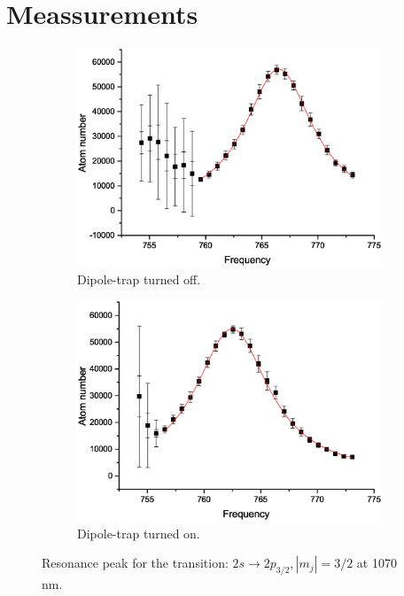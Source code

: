 \chapter{Meassurements}

\begin{figure}[H]
\centering
\begin{subfigure}[b]{0.48\textwidth}
                \includegraphics[width=\textwidth]{withoutodt}
                \caption{Dipole-trap turned off.}
\end{subfigure}
\begin{subfigure}[b]{0.48\textwidth}
               \includegraphics[width=\textwidth]{withodt}
                \caption{Dipole-trap turned on.}
\end{subfigure}


\caption{Resonance peak for the transition: $2s\rightarrow2p_{3/2}, |m_j|=3/2$ at 1070 nm.}
\label{resonance}
\end{figure}



